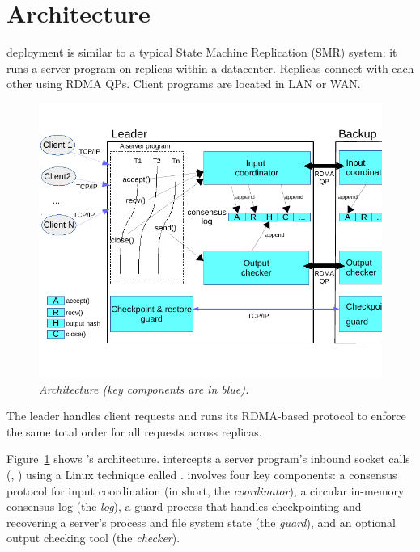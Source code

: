 \section{Architecture} \label{sec:arch}

\xxx deployment is similar to a typical State Machine Replication (SMR) system: 
it runs a server program on replicas within a datacenter. Replicas connect with 
each other using RDMA QPs. Client programs are located in LAN or WAN.

\begin{figure}[ht]
\begin{center}
\includegraphics{figures/arch}
\caption{\em \xxx Architecture (key components are in
  blue).}\label{fig:arch}
\end{center}
\end{figure}

The \xxx leader handles client requests and runs its RDMA-based protocol to 
enforce the same total order for all requests across replicas.

Figure~\ref{fig:arch} shows \xxx's architecture. \xxx intercepts a server 
program's inbound socket calls (\eg, \recv) using a Linux technique called 
\ldpreload. \xxx involves four key components: a \paxos consensus protocol for 
input coordination (in short, the \emph{coordinator}), a circular in-memory 
consensus log (the \emph{log}), a guard process that handles checkpointing 
and recovering a server's process and file system state (the 
\emph{guard}), and an optional output checking tool (the \emph{checker}).

